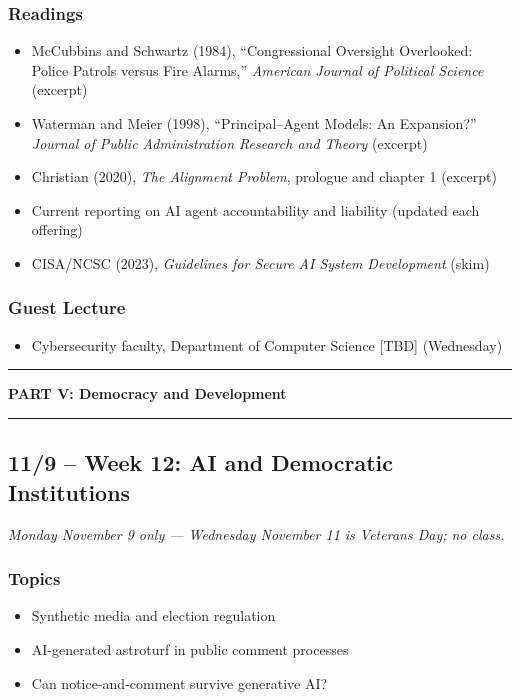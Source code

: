 \documentclass[12pt]{article}
\begin{document}
    \subsubsection*{Readings}
        \begin{itemize}
            \item McCubbins and Schwartz (1984), ``Congressional Oversight Overlooked: Police Patrols versus Fire Alarms,'' \emph{American Journal of Political Science} (excerpt)
            \item Waterman and Meier (1998), ``Principal--Agent Models: An Expansion?'' \emph{Journal of Public Administration Research and Theory} (excerpt)
            \item Christian (2020), \emph{The Alignment Problem}, prologue and chapter 1 (excerpt)
            \item Current reporting on AI agent accountability and liability (updated each offering)
            \item CISA/NCSC (2023), \emph{Guidelines for Secure AI System Development} (skim)
        \end{itemize}
    \subsubsection*{Guest Lecture}
        \begin{itemize}
            \item Cybersecurity faculty, Department of Computer Science [TBD] (Wednesday)
        \end{itemize}

\bigskip
\noindent\rule{\textwidth}{0.6pt}
\begin{center}\textbf{PART V: Democracy and Development}\end{center}
\noindent\rule{\textwidth}{0.6pt}

\subsection*{11/9 -- Week 12: AI and Democratic Institutions}
\emph{Monday November 9 only --- Wednesday November 11 is Veterans Day; no class.}
    \subsubsection*{Topics}
        \begin{itemize}
            \item Synthetic media and election regulation
            \item AI-generated astroturf in public comment processes
            \item Can notice-and-comment survive generative AI?
        \end{itemize}
\end{document}
